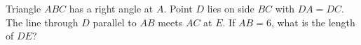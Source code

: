 Triangle $ABC$ has a right angle at $A$. Point $D$ lies on side $BC$ with $DA=DC$. The line through $D$ parallel to $AB$ meets $AC$ at $E$. If $AB=6$, what is the length of $DE$?
